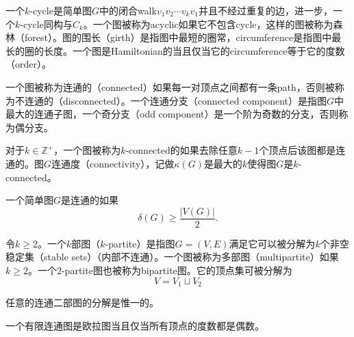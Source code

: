 \begin{definition}
	一个$k$-cycle是简单图$G$中的闭合walk$v_1v_2\cdots v_kv_1$并且不经过重复的边，进一步，一个$k$-cycle同构与$C_k$。一个图被称为acyclic如果它不包含cycle，这样的图被称为森林（forest）。图的围长（girth）是指图中最短的圈常，circumference是指图中最长的圈的长度。一个图是Hamiltonian的当且仅当它的circumference等于它的度数（order）。
\end{definition}
\begin{definition}
	一个图被称为连通的（connected）如果每一对顶点之间都有一条path，否则被称为不连通的（disconnected）。一个连通分支（connected component）是指图$G$中最大的连通子图，一个奇分支（odd component）是一个阶为奇数的分支，否则称为偶分支。
\end{definition}
\begin{definition}
	对于$k\in \mathbb Z^+$，一个图被称为$k$-connected的如果去除任意$k-1$个顶点后该图都是连通的。图$G$连通度（connectivity），记做$\kappa (G)$是最大的$k$使得图$G$是$k$-connected。
\end{definition}
\begin{theorem}
	一个简单图$G$是连通的如果
	\begin{equation*}
		\delta(G)\geq \frac{|V(G)|}{2}.
	\end{equation*}
\end{theorem}
\begin{definition}
	令$k\geq 2$。一个$k$部图（$k$-partite）是指图$G = (V, E)$满足它可以被分解为$k$个非空稳定集（stable sets）（内部不连通）。一个图被称为多部图（multipartite）如果$k\geq 2$。一个$2$-partite图也被称为bipartite图。它的顶点集可被分解为
	\begin{equation*}
		V = V_1\sqcup V_2
	\end{equation*}
\end{definition}
\begin{theorem}
	任意的连通二部图的分解是惟一的。
\end{theorem}
\begin{theorem}
	一个有限连通图是欧拉图当且仅当所有顶点的度数都是偶数。
\end{theorem}
